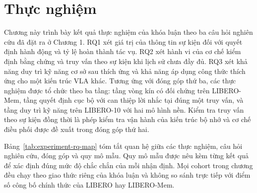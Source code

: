 \chapter{Thực nghiệm}

Chương này trình bày kết quả thực nghiệm của khóa luận theo ba câu hỏi nghiên cứu đã đặt ra ở Chương 1. RQ1 xét giá trị của thông tin sự kiện đối với quyết định hành động và tỷ lệ hoàn thành tác vụ. RQ2 xét hành vi của cơ chế kiểm định bằng chứng và truy vấn theo sự kiện khi lịch sử chưa đầy đủ. RQ3 xét khả năng duy trì kỹ năng cơ sở sau thích ứng và khả năng áp dụng công thức thích ứng cho một kiến trúc VLA khác. Tương ứng với đóng góp thứ ba, các thực nghiệm được tổ chức theo ba tầng: tầng vòng kín có đối chứng trên LIBERO-Mem, tầng quyết định cục bộ với can thiệp lời nhắc tại đúng một truy vấn, và tầng duy trì kỹ năng trên LIBERO-10 với hai mô hình nền. Kiểm tra truy vấn theo sự kiện đồng thời là phép kiểm tra vận hành của kiến trúc bộ nhớ và cơ chế điều phối được đề xuất trong đóng góp thứ hai.

Bảng~\ref{tab:experiment-rq-map} tóm tắt quan hệ giữa các thực nghiệm, câu hỏi nghiên cứu, đóng góp và quy mô mẫu. Quy mô mẫu được nêu kèm từng kết quả để xác định đúng mức độ chắc chắn của mỗi nhận định. Mọi cohort trong chương đều chạy theo giao thức riêng của khóa luận và không so sánh trực tiếp với điểm số công bố chính thức của LIBERO hay LIBERO-Mem.

